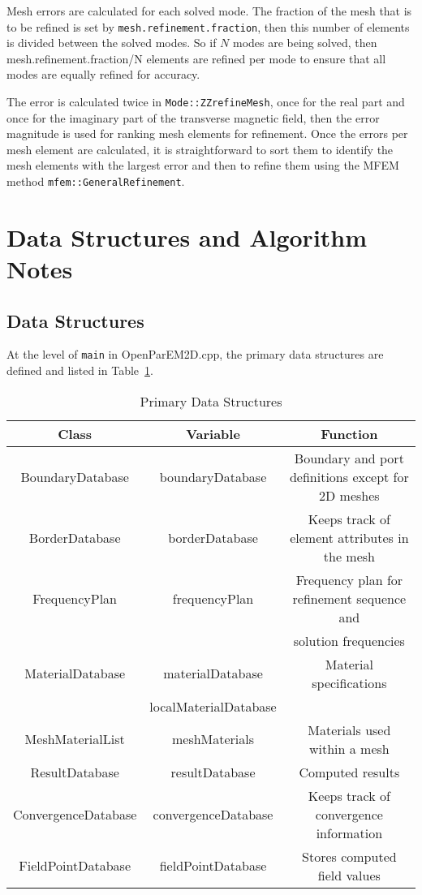 \documentclass[titlepage]{article}
\renewcommand\_{\textunderscore\linebreak[1]}
\begin{document}
Mesh errors are calculated for each solved mode.  The fraction of the mesh that is to be refined is set by \texttt{mesh.refinement.fraction}, then this number of elements is divided between the solved modes.  So if $N$ modes are being solved, then mesh.refinement.fraction/N elements are refined per mode to ensure that all modes are equally refined for accuracy.  

The error is calculated twice in \texttt{Mode::ZZrefineMesh}, once for the real part and once for the imaginary part of the transverse magnetic field, then the error magnitude is used for ranking mesh elements for refinement.
Once the errors per mesh element are calculated, it is straightforward to sort them to identify the mesh elements with the largest error and then to refine them using the MFEM method \texttt{mfem::GeneralRefinement}.

\section{Data Structures and Algorithm Notes}

\subsection{Data Structures}

At the level of \texttt{main} in OpenParEM2D.cpp, the primary data structures are defined and listed in Table~\ref{table:data_structures}.
\begin{table}
\small
\caption{Primary Data Structures}
\begin{center}
\begin{tabular}{|c|c|c|}
\hline
Class & Variable & Function \\
\hline
BoundaryDatabase & boundaryDatabase & Boundary and port definitions except for 2D meshes \\
BorderDatabase & borderDatabase & Keeps track of element attributes in the mesh \\
FrequencyPlan & frequencyPlan & Frequency plan for refinement sequence and \\
              &               & solution frequencies \\
MaterialDatabase & materialDatabase       & Material specifications \\
                 & localMaterialDatabase  &                         \\
MeshMaterialList & meshMaterials & Materials used within a mesh \\
ResultDatabase & resultDatabase & Computed results \\
ConvergenceDatabase & convergenceDatabase & Keeps track of convergence information \\
FieldPointDatabase & fieldPointDatabase & Stores computed field values \\
\hline
\end{tabular}
\end{center}
\label{table:data_structures}
\end{table}
\end{document}
